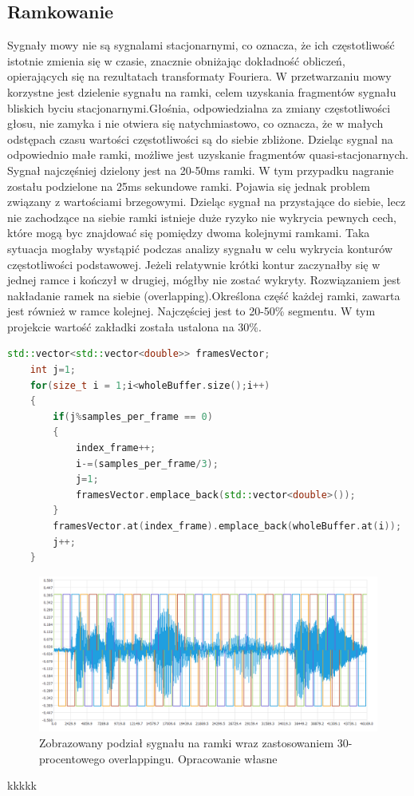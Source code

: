 \documentclass[a4paper,12 pt]{article}
\begin{document}
\subsection{Ramkowanie}
Sygnały mowy nie są sygnalami stacjonarnymi, co oznacza, że ich częstotliwość istotnie zmienia się w czasie, znacznie obniżając dokładność obliczeń, opierających się na rezultatach transformaty Fouriera.
W przetwarzaniu mowy korzystne jest dzielenie sygnału na ramki, celem uzyskania fragmentów sygnału bliskich byciu stacjonarnymi.Głośnia, odpowiedzialna za zmiany częstotliwości głosu, nie zamyka i nie otwiera się natychmiastowo, co oznacza, że w małych odstępach czasu wartości częstotliwości są do siebie zbliżone. Dzieląc sygnal na odpowiednio małe ramki, możliwe jest uzyskanie fragmentów quasi-stacjonarnych. Sygnał najczęśniej dzielony jest na 20-50ms ramki. W tym przypadku nagranie zostału podzielone na 25ms sekundowe ramki.
Pojawia się jednak problem związany z wartościami brzegowymi. Dzieląc sygnał na przystające do siebie, lecz nie zachodzące na siebie ramki istnieje duże ryzyko nie wykrycia pewnych cech, które mogą byc znajdować się pomiędzy dwoma kolejnymi ramkami. 
Taka sytuacja mogłaby wystąpić podczas analizy sygnału w celu wykrycia konturów częstotliwości podstawowej. Jeżeli relatywnie krótki kontur zaczynałby się w jednej ramce i kończył w drugiej, mógłby nie zostać wykryty.
Rozwiązaniem jest nakładanie ramek na siebie (overlapping).Określona część każdej ramki, zawarta jest również w ramce kolejnej. Najczęściej jest to 20-50\% segmentu. W tym projekcie wartość zakładki została ustalona na 30\%.

\begin{lstlisting}[caption={Przedstawienie sposobu dokonywania podziału na ramki, wraz z zastosowaniem overlappingu},label={lst:label},language=C++]
    std::vector<std::vector<double>> framesVector;
    int j=1;
    for(size_t i = 1;i<wholeBuffer.size();i++)
    {
        if(j%samples_per_frame == 0)
        {
            index_frame++;
            i-=(samples_per_frame/3);
            j=1;
            framesVector.emplace_back(std::vector<double>());
        }
        framesVector.at(index_frame).emplace_back(wholeBuffer.at(i));
        j++;
    }
\end{lstlisting}
\FloatBarrier
\begin{figure}[h]

\includegraphics[scale=0.7]{overlapping.png}
\caption{Zobrazowany podział sygnału na ramki wraz zastosowaniem 30-procentowego overlappingu. Opracowanie własne}

\end{figure}
\FloatBarrier
kkkkk
\end{document}
